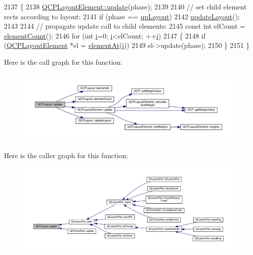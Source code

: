 \begin{DoxyCode}
2137 \{
2138   \hyperlink{class_q_c_p_layout_element_a929c2ec62e0e0e1d8418eaa802e2af9b}{QCPLayoutElement::update}(phase);
2139   
2140   \textcolor{comment}{// set child element rects according to layout:}
2141   \textcolor{keywordflow}{if} (phase == \hyperlink{class_q_c_p_layout_element_a0d83360e05735735aaf6d7983c56374da5d1ccf5d79967c232c3c511796860045}{upLayout})
2142     \hyperlink{class_q_c_p_layout_a165c77f6287ac92e8d03017ad913378b}{updateLayout}();
2143   
2144   \textcolor{comment}{// propagate update call to child elements:}
2145   \textcolor{keyword}{const} \textcolor{keywordtype}{int} elCount = \hyperlink{class_q_c_p_layout_a39d3e9ef5d9b82ab1885ba1cb9597e56}{elementCount}();
2146   \textcolor{keywordflow}{for} (\textcolor{keywordtype}{int} \hyperlink{_comparision_pictures_2_createtest_image_8m_a6f6ccfcf58b31cb6412107d9d5281426}{i}=0; \hyperlink{_comparision_pictures_2_createtest_image_8m_a6f6ccfcf58b31cb6412107d9d5281426}{i}<elCount; ++\hyperlink{_comparision_pictures_2_createtest_image_8m_a6f6ccfcf58b31cb6412107d9d5281426}{i})
2147   \{
2148     \textcolor{keywordflow}{if} (\hyperlink{class_q_c_p_layout_element}{QCPLayoutElement} *el = \hyperlink{class_q_c_p_layout_afa73ca7d859f8a3ee5c73c9b353d2a56}{elementAt}(\hyperlink{_comparision_pictures_2_createtest_image_8m_a6f6ccfcf58b31cb6412107d9d5281426}{i}))
2149       el->update(phase);
2150   \}
2151 \}
\end{DoxyCode}


Here is the call graph for this function\+:\nopagebreak
\begin{figure}[H]
\begin{center}
\leavevmode
\includegraphics[width=350pt]{class_q_c_p_layout_a34ab477e820537ded7bade4399c482fd_cgraph}
\end{center}
\end{figure}




Here is the caller graph for this function\+:\nopagebreak
\begin{figure}[H]
\begin{center}
\leavevmode
\includegraphics[width=350pt]{class_q_c_p_layout_a34ab477e820537ded7bade4399c482fd_icgraph}
\end{center}
\end{figure}



